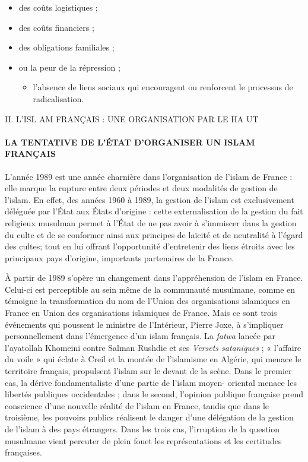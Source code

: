\begin{itemize}
\item
  des coûts logistiques ;
\item
  des coûts financiers ;
\item
  des obligations familiales ;
\item
  ou la peur de la répression ;

  \begin{itemize}
  \item
    
    l'absence de liens sociaux qui encouragent ou renforcent le
    processus de radicalisation.
    
  \end{itemize}
\end{itemize}


II. L'ISL AM FRANÇAIS : UNE ORGANISATION PAR LE HA UT


\hypertarget{la-tentative-de-luxe9tat-dorganiser-un-islam-franuxe7ais}{%
\paragraph{LA TENTATIVE DE L'ÉTAT D'ORGANISER UN ISLAM
FRANÇAIS}\label{la-tentative-de-luxe9tat-dorganiser-un-islam-franuxe7ais}}


L'année 1989 est une année charnière dans l'organisation de l'islam de
France : elle marque la rupture entre deux périodes et deux modalités de
gestion de l'islam. En effet, des années 1960 à 1989, la gestion de
l'islam est exclusivement déléguée par l'État aux États d'origine :
cette externalisation de la gestion du fait religieux musulman permet à
l'État de ne pas avoir à s'immiscer dans la gestion du culte et de se
conformer ainsi aux principes de laïcité et de neutralité à l'égard des
cultes; tout en lui offrant l'opportunité d'entretenir des liens étroits
avec les principaux pays d'origine, importants partenaires de la France.

À partir de 1989 s'opère un changement dans l'appréhension de l'islam en
France. Celui-ci est perceptible au sein même de la communauté
musulmane, comme en témoigne la transformation du nom de l'Union des
organisations islamiques en France en Union des organisations islamiques
de France. Mais ce sont trois événements qui poussent le ministre de
l'Intérieur, Pierre Joxe, à s'impliquer personnellement dans l'émergence
d'un islam français. La \emph{fatwa} lancée par l'ayatollah Khomeini
contre Salman Rushdie et ses \emph{Versets sataniques} ; « l'affaire du
voile » qui éclate à Creil et la montée de l'islamisme en Algérie, qui
menace le territoire français, propulsent l'islam sur le devant de la
scène. Dans le premier cas, la dérive fondamentaliste d'une partie de
l'islam moyen- oriental menace les libertés publiques occidentales ;
dans le second, l'opinion publique française prend conscience d'une
nouvelle réalité de l'islam en France, tandis que dans le troisième, les
pouvoirs publics réalisent le danger d'une délégation de la gestion de
l'islam à des pays étrangers. Dans les trois cas, l'irruption de la
question musulmane vient percuter de plein fouet les représentations et
les certitudes françaises.



